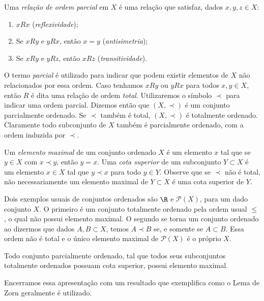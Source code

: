Uma \emph{relação de ordem parcial} em \( X \) é uma relação que satisfaz, dados \( x, y, z \in X \):
\begin{enumerate}[label=\roman*)]
    \item \( x R x \) (\emph{reflexividade});
    \item Se \( x R y \) e \( y R x \), então \( x = y \) (\emph{antisimetria});
    \item Se \( x R y \) e \( y R z \), então \( x R z \) (\emph{transitividade}).
\end{enumerate}
O termo \emph{parcial} é utilizado para indicar que podem existir elementos de \( X \) não relacionados por essa ordem.
Caso tenhamos \( x R y \) ou \( y R x \) para todos \( x, y \in X \), então \( R \) é dita uma relação de ordem \emph{total}.
Utilizaremos o símbolo \( \prec \) para indicar uma ordem parcial.
Dizemos então que \( ( X, \prec ) \) é um conjunto parcialmente ordenado.
Se \( \prec \) também é total, \( ( X, \prec ) \) é totalmente ordenado.
Claramente todo subconjunto de \( X \) também é parcialmente ordenado, com a ordem induzida por \( \prec \).

Um \emph{elemento maximal} de um conjunto ordenado \( X \) é um elemento \( x \) tal que se \( y \in X \) com \( x \prec y \), então \( y = x \).
Uma \emph{cota superior} de um subconjunto \( Y \subset X \) é um elemento \( x \in X \) tal que \( y \prec x \) para todo \( y \in Y \).
Observe que se \( \prec \) não é total, não necessariamente um elemento maximal de \( Y \subset X \) é uma cota superior de \( Y \).

Dois exemplos usuais de conjuntos ordenados são \( \R \) e \( \mathcal{P} ( X ) \), para um dado conjunto \( X \).
O primeiro é um conjunto totalmente ordenado pela ordem usual \( \leq \), o qual não possui elemento maximal.
O segundo se torna um conjunto ordenado ao dizermos que dados \( A, B \subset X \), temos \( A \prec B \) se, e somente se \( A \subset  B \).
Essa ordem não é total e o único elemento maximal de \( \mathcal{P} ( X ) \) é o próprio \( X \).

\begin{axiom}
    Todo conjunto parcialmente ordenado, tal que todos seus subconjuntos totalmente ordenados possuam cota superior, possui elemento maximal.
\end{axiom}

Encerramos essa apresentação com um resultado que exemplifica como o Lema de Zorn geralmente é utilizado.


